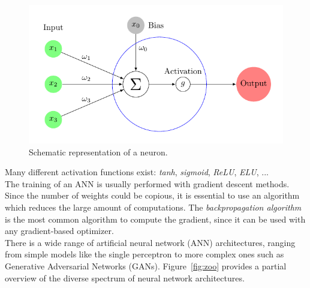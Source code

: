 \begin{figure}[h]
\centering
\includegraphics[scale=1]{Chapters/Chapter2/neuron.pdf}
\caption{Schematic representation of a neuron.}
\end{figure}


Many different activation functions exist: \textit{tanh}, \textit{sigmoid}, \textit{ReLU}, \textit{ELU}, ...\\
The training of an ANN is usually performed with gradient descent methods.
Since the number of weights could be copious, it is essential to use an algorithm which reduces the large amount of computations.
The \textit{backpropagation algorithm} is the most common algorithm to compute the gradient, since it can be used with any gradient-based optimizer.\\

There is a wide range of artificial neural network (ANN) architectures, ranging from simple models like the single perceptron to more complex ones 
such as Generative Adversarial Networks (GANs). Figure~\ref{fig:zoo} provides a partial overview of the diverse spectrum of neural network architectures.

